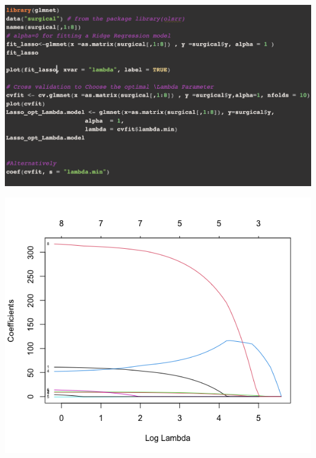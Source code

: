 \documentclass[compress]{beamer}
\begin{document}
\begin{frame}

\includegraphics[scale=.4]{figs8/LASSO_CODE.png} \\


\end{frame}









\begin{frame}

\includegraphics[scale=.5]{figs8/Lasso_coef.png} \\


\end{frame}
\end{document}
